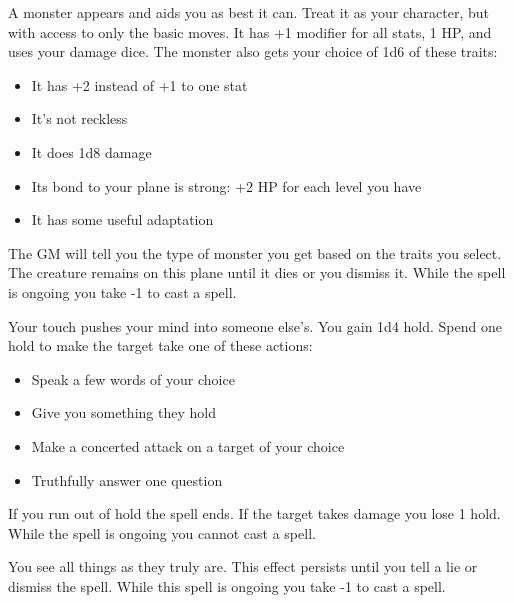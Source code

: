 


 A monster appears and aids you as best it can. Treat it as your character, but with access to only the basic moves. It has +1 modifier for all stats, 1 HP, and uses your damage dice. The monster also gets your choice of 1d6 of these traits: 
\begin{itemize}
\item It has +2 instead of +1 to one stat
\item It's not reckless
\item It does 1d8 damage
\item Its bond to your plane is strong: +2 HP for each level you have
\item It has some useful adaptation

\end{itemize}


 The GM will tell you the type of monster you get based on the traits you select. The creature remains on this plane until it dies or you dismiss it. While the spell is ongoing you take -1 to cast a spell.





 Your touch pushes your mind into someone else's. You gain 1d4 hold. Spend one hold to make the target take one of these actions:
\begin{itemize}
\item Speak a few words of your choice
\item Give you something they hold
\item Make a concerted attack on a target of your choice
\item Truthfully answer one question

\end{itemize}


 If you run out of hold the spell ends. If the target takes damage you lose 1 hold. While the spell is ongoing you cannot cast a spell.





 You see all things as they truly are. This effect persists until you tell a lie or dismiss the spell. While this spell is ongoing you take -1 to cast a spell.





